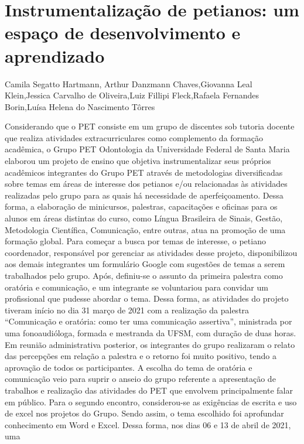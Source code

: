 

\section{Instrumentalização de petianos: um espaço de desenvolvimento e aprendizado}

Camila Segatto Hartmann, Arthur Danzmann Chaves,Giovanna Leal Klein,Jessica Carvalho de Oliveira,Luiz Fillipi Fleck,Rafaela Fernandes Borin,Luísa Helena do Nascimento Tôrres

Considerando que o PET consiste em um grupo de discentes sob tutoria docente que realiza 
atividades extracurriculares como complemento da formação acadêmica, o Grupo PET 
Odontologia da Universidade Federal de Santa Maria elaborou um projeto de ensino que objetiva 
instrumentalizar seus próprios acadêmicos integrantes do Grupo PET através de metodologias 
diversificadas sobre temas em áreas de interesse dos petianos e/ou relacionadas às atividades 
realizadas pelo grupo para as quais há necessidade de aperfeiçoamento. Dessa forma, a elaboração 
de minicursos, palestras, capacitações e oficinas para os alunos em áreas distintas do curso, como 
Língua Brasileira de Sinais, Gestão, Metodologia Científica, Comunicação, entre outras, atua na 
promoção de uma formação global. Para começar a busca por temas de interesse, o petiano 
coordenador, responsável por gerenciar as atividades desse projeto, disponibilizou aos demais 
integrantes um formulário Google com sugestões de temas a serem trabalhados pelo grupo. Após, 
definiu-se o assunto da primeira palestra como oratória e comunicação, e um integrante se 
voluntariou para convidar um profissional que pudesse abordar o tema. Dessa forma, as atividades 
do projeto tiveram início no dia 31 março de 2021 com a realização da palestra “Comunicação e 
oratória: como ter uma comunicação assertiva”, ministrada por uma fonoaudióloga, formada e 
mestranda da UFSM, com duração de duas horas. Em reunião administrativa posterior, os 
integrantes do grupo realizaram o relato das percepções em relação a palestra e o retorno foi muito 
positivo, tendo a aprovação de todos os participantes. A escolha do tema de oratória e comunicação 
veio para suprir o anseio do grupo referente a apresentação de trabalhos e realização das atividades 
do PET que envolvem principalmente falar em público. Para o segundo encontro, considerou-se 
as exigências de escrita e uso de excel nos projetos do Grupo. Sendo assim, o tema escolhido foi 
aprofundar conhecimento em Word e Excel. Dessa forma, nos dias 06 e 13 de abril de 2021, uma 
